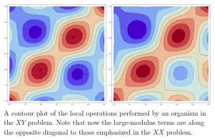 \documentclass[11pt,twocolumn]{article}
\begin{document}
	\begin{figure}[htpb]
		\centering
			\includegraphics[scale=0.2]{xy_alt_matrices.png}
		\centering
		\caption{A contour plot of the local operations performed by an organism in the $XY$ problem. Note that now the large-modulus terms are along the opposite diagonal to those emphasized in the $XX$ problem.}
		\label{fig:xy_alt}
	\end{figure}



				
				
               
\end{document}
